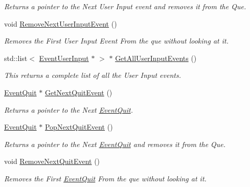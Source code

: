 \begin{DoxyCompactItemize}
\begin{DoxyCompactList}\small\item\em Returns a pointer to the Next User Input event and removes it from the Que. \item\end{DoxyCompactList}\item 
void \hyperlink{classphys_1_1EventManager_add41b5f4d2942461bcaf40a97ad40b09}{RemoveNextUserInputEvent} ()
\begin{DoxyCompactList}\small\item\em Removes the First User Input Event From the que without looking at it. \item\end{DoxyCompactList}\item 
std::list$<$ \hyperlink{classphys_1_1EventUserInput}{EventUserInput} $\ast$ $>$ $\ast$ \hyperlink{classphys_1_1EventManager_aef240dacae9479c4385d540e4feab867}{GetAllUserInputEvents} ()
\begin{DoxyCompactList}\small\item\em This returns a complete list of all the User Input events. \item\end{DoxyCompactList}\item 
\hyperlink{classphys_1_1EventQuit}{EventQuit} $\ast$ \hyperlink{classphys_1_1EventManager_ad7da09e5422b1db79ac4187ee9198d0c}{GetNextQuitEvent} ()
\begin{DoxyCompactList}\small\item\em Returns a pointer to the Next \hyperlink{classphys_1_1EventQuit}{EventQuit}. \item\end{DoxyCompactList}\item 
\hyperlink{classphys_1_1EventQuit}{EventQuit} $\ast$ \hyperlink{classphys_1_1EventManager_a9b0d8e4d76fef35423bb862d7127b747}{PopNextQuitEvent} ()
\begin{DoxyCompactList}\small\item\em Returns a pointer to the Next \hyperlink{classphys_1_1EventQuit}{EventQuit} and removes it from the Que. \item\end{DoxyCompactList}\item 
void \hyperlink{classphys_1_1EventManager_a5031871aa6e044764ec2963228f735dd}{RemoveNextQuitEvent} ()
\begin{DoxyCompactList}\small\item\em Removes the First \hyperlink{classphys_1_1EventQuit}{EventQuit} From the que without looking at it. \item\end{DoxyCompactList}\item 

\end{DoxyCompactItemize}
